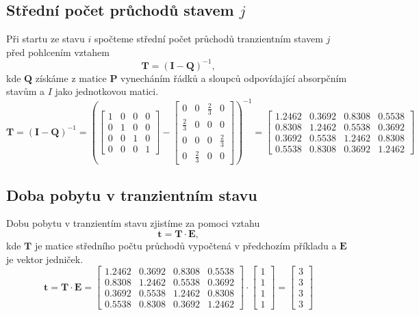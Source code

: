 \documentclass{article}
\begin{document}
		\subsection{Střední počet průchodů stavem \(j\)}
			Při startu ze stavu \(i\) spočteme střední počet průchodů tranzientním stavem \(j\) před pohlcením vztahem \[\mathbf{T} = (\mathbf{I}-\mathbf{Q})^{-1},\] kde \(\mathbf{Q}\) získáme z matice \(\mathbf{P}\) vynecháním řádků a sloupců odpovídající absorpčním stavům a \(I\) jako jednotkovou matici.
			\[\mathbf{T} = (\mathbf{I}-\mathbf{Q})^{-1}=
			\left(
			\begin{bmatrix}
				1&0&0&0\\
				0&1&0&0\\
				0&0&1&0\\
				0&0&0&1
			\end{bmatrix}-
			\begin{bmatrix}
				0&0&\frac{2}{3}&0\\
				\frac{2}{3}&0&0&0\\
				0&0&0&\frac{2}{3}\\
				0&\frac{2}{3}&0&0
			\end{bmatrix}
			\right)^{-1}=
			\begin{bmatrix}
				1.2462&    0.3692&    0.8308&    0.5538\\
				0.8308&    1.2462&    0.5538&    0.3692\\
				0.3692&    0.5538&    1.2462&    0.8308\\
				0.5538&    0.8308&    0.3692&    1.2462
			\end{bmatrix}\]
		\subsection{Doba pobytu v tranzientním stavu}
			Dobu pobytu v tranzientím stavu zjistíme za pomoci vztahu \[\mathbf{t}=\mathbf{T}\cdot \mathbf{E},\] kde \(\mathbf{T}\) je matice středního počtu průchodů vypočtená v předchozím příkladu a \(\mathbf{E}\) je vektor jedniček.
			\[\mathbf{t} = \mathbf{T}\cdot \mathbf{E}=
			\begin{bmatrix}
				1.2462&    0.3692&    0.8308&    0.5538\\
				0.8308&    1.2462&    0.5538&    0.3692\\
				0.3692&    0.5538&    1.2462&    0.8308\\
				0.5538&    0.8308&    0.3692&    1.2462
			\end{bmatrix}\cdot
			\begin{bmatrix}
				1\\
				1\\
				1\\
				1
			\end{bmatrix}=
			\begin{bmatrix}
				3\\
				3\\
				3\\
				3
			\end{bmatrix}\]
\end{document}
